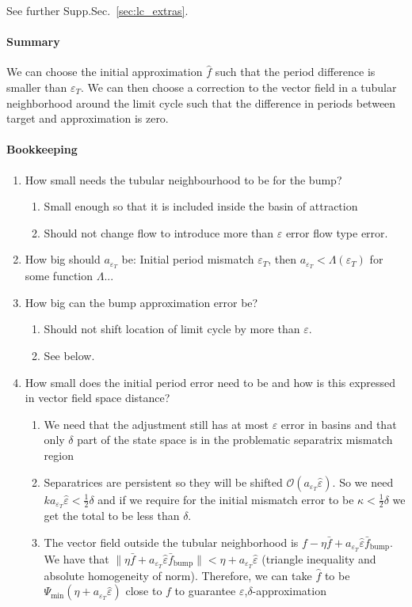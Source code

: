 \documentclass{article}
\theoremstyle{definition} \newtheorem{definition}{Definition}
\theoremstyle{remark} \newtheorem{remark}{Remark}
\newcounter{ct}
\begin{document}
See further Supp.Sec.~\ref{sec:lc_extras}.

\paragraph{Summary}
We can choose the initial approximation $\hat{f}$ such that the period difference is smaller than $\varepsilon_T$.
We can then choose a correction to the vector field in a tubular neighborhood around the limit cycle such that the difference in periods between target and approximation is zero.


\paragraph{Bookkeeping}
\begin{enumerate}
\item How small needs the tubular neighbourhood to be for the bump? 
\begin{enumerate}
\item Small enough so that it is included inside the basin of attraction
\item Should not change flow to introduce more than $\varepsilon$ error flow type error.
\end{enumerate}
\item How big should $a_{\varepsilon_T}$ be: Initial period mismatch $\varepsilon_T$, then $a_{\varepsilon_T}< \Lambda(\varepsilon_T)$ for some function $\Lambda$...
\item How big can the bump approximation error be?
\begin{enumerate}
\item Should not shift location of limit cycle by more than $\varepsilon$.
\item See below.
\end{enumerate}
\item How small does the initial period error need to be and how is this expressed in vector field space distance?
\begin{enumerate}
\item We need that the adjustment still has at most $\varepsilon$ error in basins and that only $\delta$ part of the state space is in the problematic separatrix mismatch region
\item Separatrices are persistent so they will be shifted $\mathcal{O}(a_{\varepsilon_T}\hat \varepsilon)$. So we need $ka_{\varepsilon_T}\hat \varepsilon < \tfrac{1}{2}\delta$ and if we require for the initial mismatch error to be $\kappa<\tfrac{1}{2}\delta$ we get the total to be less than $\delta$. 
\item The vector field outside the tubular neighborhood is $f - \eta\bar f  + a_{\varepsilon_T}\hat \varepsilon\bar f_{\operatorname{bump}}$. 
We have that $\|\eta\bar f  + a_{\varepsilon_T}\hat \varepsilon\bar f_{\operatorname{bump}}\| < \eta + a_{\varepsilon_T}\hat \varepsilon$ (triangle inequality and absolute homogeneity of norm). Therefore, we can take $\hat f$ to be  $\Psi_{\min}(\eta + a_{\varepsilon_T}\hat \varepsilon)$ close to $f$ to guarantee $\varepsilon$,$\delta$-approximation
\end{enumerate}
\end{enumerate}
\end{document}
